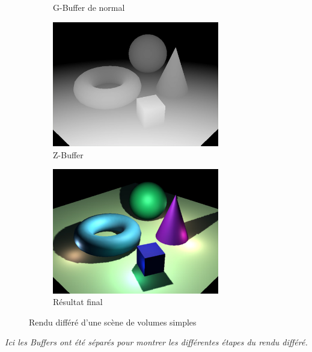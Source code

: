 \begin{figure}[h]
\begin{subfigure}{0.5\textwidth}
        \caption{G-Buffer de normal}
        \label{fig:drendering_pass_normal}
    \end{subfigure}
    \begin{subfigure}{0.5\textwidth}
        \centering
        \includegraphics[width=0.8\textwidth]{images/Deferred_rendering_pass_dep.jpg}
        \caption{Z-Buffer}
        \label{fig:drendering_pass_depth}
    \end{subfigure}
    \begin{subfigure}{0.5\textwidth}
        \centering
        \includegraphics[width=0.8\textwidth]{images/Deferred_rendering_pass_res.jpg}
        \caption{Résultat final}
        \label{fig:drendering_result}
    \end{subfigure}
    \caption{Rendu différé d'une scène de volumes simples}
    \label{fig:defferred_rendering}
\end{figure}

\emph{Ici les Buffers ont été séparés pour montrer les différentes étapes du rendu différé.}

